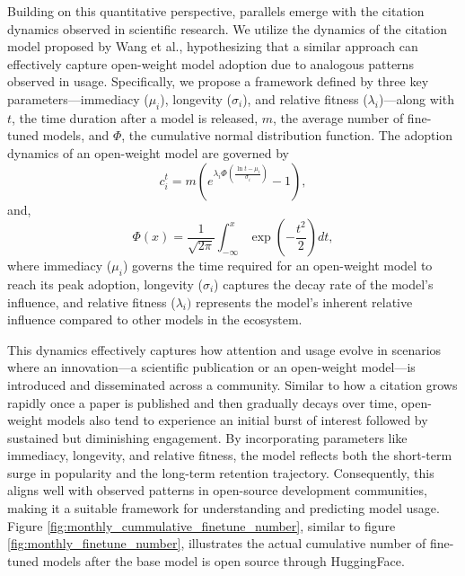\documentclass{article} %
\begin{document}
       Building on this quantitative perspective, parallels emerge with the citation dynamics observed in scientific research\cite{wangQuantifyingLongTermScientific2013}. We utilize the dynamics of the citation model proposed by Wang et al., hypothesizing that a similar approach can effectively capture open-weight model adoption due to analogous patterns observed in usage. Specifically, we propose a framework defined by three key parameters—immediacy ($\mu_i$), longevity ($\sigma_i$), and relative fitness ($\lambda_i$)—along with $t$, the time duration after a model is released, $m$, the average number of fine-tuned models, and $\Phi$, the cumulative normal distribution function. The adoption dynamics of an open-weight model are governed by
        \begin{equation} 
            c_i^t = m \left(e^{\lambda_i \Phi \left( \frac{\ln t - \mu_i}{\sigma_i} \right) } - 1 \right), 
            \label{eq:citation_model}
        \end{equation}
        and, 
        \begin{equation}
            \Phi(x) = \frac{1}{\sqrt{2\pi}} \int_{-\infty}^{x} \exp\!\left(-\frac{t^2}{2}\right) dt,
            \label{eq:cumm_normal_distribution}
        \end{equation}
        where immediacy ($\mu_i$) governs the time required for an open-weight model to reach its peak adoption, longevity ($\sigma_i$) captures the decay rate of the model’s influence, and relative fitness ($\lambda_i)$ represents the model’s inherent relative influence compared to other models in the ecosystem.

        This dynamics effectively captures how attention and usage evolve in scenarios where an innovation—a scientific publication or an open-weight model—is introduced and disseminated across a community. Similar to how a citation grows rapidly once a paper is published and then gradually decays over time, open-weight models also tend to experience an initial burst of interest followed by sustained but diminishing engagement. By incorporating parameters like immediacy, longevity, and relative fitness, the model reflects both the short-term surge in popularity and the long-term retention trajectory. Consequently, this aligns well with observed patterns in open-source development communities, making it a suitable framework for understanding and predicting model usage. Figure \ref{fig:monthly_cummulative_finetune_number}, similar to figure \ref{fig:monthly_finetune_number}, illustrates the actual cumulative number of fine-tuned models after the base model is open source through HuggingFace. 
        
\end{document}

